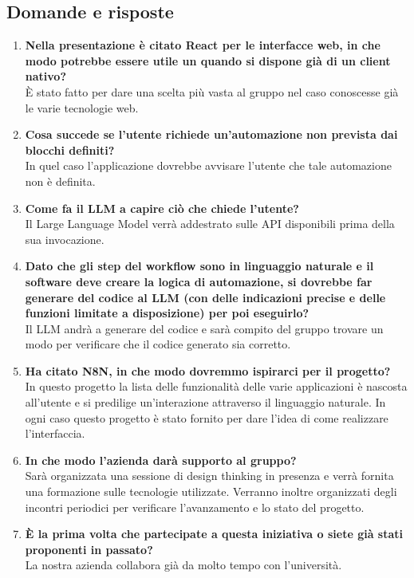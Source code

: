 \documentclass[10pt]{article}
\begin{document}
\subsection{Domande e risposte}
\begin{enumerate}
    \item \textbf{Nella presentazione è citato React per le interfacce web, in che modo potrebbe essere utile un quando si dispone già di un client nativo?} \\
    È stato fatto per dare una scelta più vasta al gruppo nel caso conoscesse già le varie tecnologie web.
    \item \textbf{Cosa succede se l'utente richiede un'automazione non prevista dai blocchi definiti?} \\
    In quel caso l'applicazione dovrebbe avvisare l'utente che tale automazione non è definita.
    \item \textbf{Come fa il LLM a capire ciò che chiede l'utente?}\\
    Il Large Language Model verrà addestrato sulle API disponibili prima della sua invocazione.
    \item \textbf{Dato che gli step del workflow sono in linguaggio naturale e il software deve creare la logica di automazione, si dovrebbe far generare del codice al LLM (con delle indicazioni precise e delle funzioni limitate a disposizione) per poi eseguirlo?}\\
    Il LLM andrà a generare del codice e sarà compito del gruppo trovare un modo per verificare che il codice generato sia corretto.
    \item \textbf{Ha citato N8N, in che modo dovremmo ispirarci per il progetto?}\\
    In questo progetto la lista delle funzionalità delle varie applicazioni è nascosta all'utente e si predilige un'interazione attraverso il linguaggio naturale. In ogni caso questo progetto è stato fornito per dare l'idea di come realizzare l'interfaccia.
    \item \textbf{In che modo l'azienda darà supporto al gruppo?}\\
    Sarà organizzata una sessione di design thinking in presenza e verrà fornita una formazione sulle tecnologie utilizzate. Verranno inoltre organizzati degli incontri periodici per verificare l'avanzamento e lo stato del progetto.
    \item \textbf{È la prima volta che partecipate a questa iniziativa o siete già stati proponenti in passato?}\\
    La nostra azienda collabora già da molto tempo con l'università.
\end{enumerate}
\end{document}
